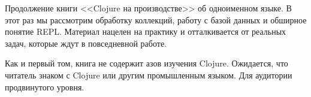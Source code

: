 \thispagestyle{empty}

Продолжение книги <<Clojure на производстве>> об одноименном языке. В этот раз
мы рассмотрим обработку коллекций, работу с базой данных и обширное понятие
REPL. Материал нацелен на практику и отталкивается от реальных задач, которые
ждут в повседневной работе.

Как и первый том, книга не содержит азов изучения Clojure. Ожидается, что
читатель знаком с Clojure или другим промышленным языком. Для аудитории
продвинутого уровня.
